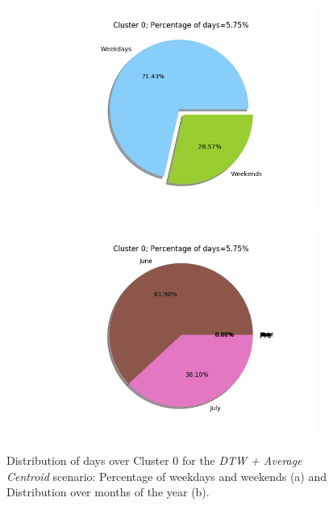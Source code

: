 \documentclass[9pt,journal,compsoc]{IEEEtran}
\begin{document}
\begin{figure}[H]
	\centering
	\begin{subfigure}{0.8\columnwidth}
		\includegraphics[scale=0.4]{images/percent_week_raw_average_4.png}
		\caption{}
	\end{subfigure}\hfill%
	
	\begin{subfigure}{0.8\columnwidth}
		\includegraphics[scale=0.4]{images/percent_months_raw_average_4.png}
		\caption{}
	\end{subfigure}%
	\caption{Distribution of days over Cluster $0$ for the \emph{DTW + Average Centroid} scenario: Percentage of weekdays and weekends (a) and Distribution over months of the year (b).}
	\label{distribution_raw_average_4clusters}
\end{figure}
\end{document}
